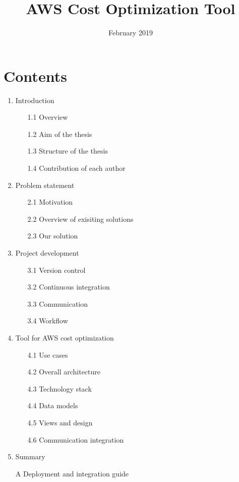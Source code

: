 \documentclass[licencjacka,en]{thesisclass}
\title{AWS Cost Optimization Tool}
\date{February 2019}
\begin{document}
    \maketitle

    \begin{abstract}
        
    \end{abstract}

    \chapter*{Contents}

    \begin{enumerate}
        \item Introduction
        \begin{enumerate}
            \item [1.1] Overview
            \item [1.2] Aim of the thesis
            \item [1.3] Structure of the thesis
            \item [1.4] Contribution of each author
        \end{enumerate}
        \item Problem statement
        \begin{enumerate}
            \item [2.1] Motivation
            \item [2.2] Overview of exisiting solutions
            \item [2.3] Our solution
        \end{enumerate}
        \item Project development
        \begin{enumerate}
            \item [3.1] Version control
            \item [3.2] Continuous integration
            \item [3.3] Communication
            \item [3.4] Workflow
        \end{enumerate}
        \item Tool for AWS cost optimization
        \begin{enumerate}
            \item [4.1] Use cases
            \item [4.2] Overall architecture
            \item [4.3] Technology stack
            \item [4.4] Data models
            \item [4.5] Views and design
            \item [4.6] Communication integration
        \end{enumerate}
        \item Summary
        \item [A] Deployment and integration guide
    \end{enumerate}
\end{document}

